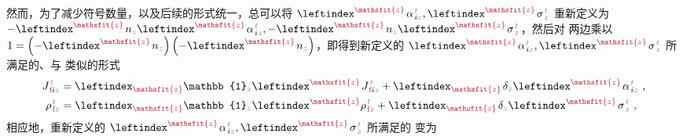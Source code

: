 然而，为了减少符号数量，以及后续的形式统一，总可以将 $\leftindex^{\textcolor{Maroon}{\mathsfit{z}}} \;\!
{\alpha}^{\;\!\mathcolor{gray}{t}}_{\;\! i\mathcolor{gray}{z}}, \leftindex^{\textcolor{Maroon}{\mathsfit{z}}} \;\! {\sigma}^{\;\!\mathcolor{gray}{t}}_{\;\! \mathcolor{gray}{z}}$ 重新定义为 $-\leftindex^{\textcolor{Maroon}{\mathsfit{z}}} \;\! n_{\mathcolor{gray}{z}} \leftindex^{\textcolor{Maroon}{\mathsfit{z}}} \;\!
{\alpha}^{\;\!\mathcolor{gray}{t}}_{\;\! i\mathcolor{gray}{z}}, -\leftindex^{\textcolor{Maroon}{\mathsfit{z}}} \;\! n_{\mathcolor{gray}{z}} \leftindex^{\textcolor{Maroon}{\mathsfit{z}}} \;\! {\sigma}^{\;\!\mathcolor{gray}{t}}_{\;\! \mathcolor{gray}{z}}$，然后对  两边乘以 $1 = \left( - \leftindex^{\textcolor{Maroon}{\mathsfit{z}}} \;\! n_{\mathcolor{gray}{z}} \right) \left( - \leftindex^{\textcolor{Maroon}{\mathsfit{z}}} \;\! n_{\mathcolor{gray}{z}} \right)$，即得到新定义的 $\leftindex^{\textcolor{Maroon}{\mathsfit{z}}} \;\!
{\alpha}^{\;\!\mathcolor{gray}{t}}_{\;\! i\mathcolor{gray}{z}}, \leftindex^{\textcolor{Maroon}{\mathsfit{z}}} \;\! {\sigma}^{\;\!\mathcolor{gray}{t}}_{\;\! \mathcolor{gray}{z}}$ 所满足的、与  类似的形式
\begin{subequations} \label{eq:e-f-01'}
\begin{align}
	J^{\;\!\mathcolor{gray}{t}}_{\;\!\textcolor{Maroon}{\text{f}} i\mathcolor{gray}{z}} &= \leftindex_{\textcolor{Maroon}{\mathsfit{z}}} {\mathbb{1}}_{\mathcolor{gray}{z}} \leftindex^{\textcolor{Maroon}{\mathsfit{z}}} \;\! J^{\;\!\mathcolor{gray}{t}}_{\;\!\textcolor{Maroon}{\text{f}} i\mathcolor{gray}{z}} + \leftindex_{\textcolor{Maroon}{\mathsfit{z}}} \;\! \delta_{\mathcolor{gray}{z}} \leftindex^{\textcolor{Maroon}{\mathsfit{z}}} \;\!
	{\alpha}^{\;\!\mathcolor{gray}{t}}_{\;\! i\mathcolor{gray}{z}} ~, \label{eq:j-f-01'} \\
	{\rho}^{\;\!\mathcolor{gray}{t}}_{\;\!\textcolor{Maroon}{\text{f}} \mathcolor{gray}{z}} &= \leftindex_{\textcolor{Maroon}{\mathsfit{z}}} {\mathbb{1}}_{\mathcolor{gray}{z}} \leftindex^{\textcolor{Maroon}{\mathsfit{z}}} {\rho}^{\;\!\mathcolor{gray}{t}}_{\;\!\textcolor{Maroon}{\text{f}} \mathcolor{gray}{z}} + \leftindex_{\textcolor{Maroon}{\mathsfit{z}}} \;\! \delta_{\mathcolor{gray}{z}} \leftindex^{\textcolor{Maroon}{\mathsfit{z}}} \;\! {\sigma}^{\;\!\mathcolor{gray}{t}}_{\;\! \mathcolor{gray}{z}} ~, \label{eq:p-f-01'}
\end{align}
\end{subequations}
相应地，重新定义的 $\leftindex^{\textcolor{Maroon}{\mathsfit{z}}} \;\!
{\alpha}^{\;\!\mathcolor{gray}{t}}_{\;\! i\mathcolor{gray}{z}}, \leftindex^{\textcolor{Maroon}{\mathsfit{z}}} \;\! {\sigma}^{\;\!\mathcolor{gray}{t}}_{\;\! \mathcolor{gray}{z}}$ 所满足的  变为
